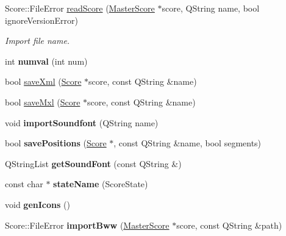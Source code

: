 \begin{DoxyCompactItemize}
Score\+::\+File\+Error \hyperlink{namespace_ms_ad2944b23a7131292b8ff341d5c023904}{read\+Score} (\hyperlink{class_ms_1_1_master_score}{Master\+Score} $\ast$score, Q\+String name, bool ignore\+Version\+Error)
\begin{DoxyCompactList}\small\item\em Import file {\itshape name}. \end{DoxyCompactList}\item 
\mbox{\label{namespace_ms_af4061ca30665502e54ca52ba2db37c64}} 
int {\bfseries numval} (int num)
\item 
bool \hyperlink{namespace_ms_a3a19855d7730ea26f4769d635488df1d}{save\+Xml} (\hyperlink{class_ms_1_1_score}{Score} $\ast$score, const Q\+String \&name)
\item 
bool \hyperlink{namespace_ms_a772f048bd958bf708fd495e49c49aac8}{save\+Mxl} (\hyperlink{class_ms_1_1_score}{Score} $\ast$score, const Q\+String \&name)
\item 
\mbox{\label{namespace_ms_a1962d0f797290cd3ca96f82da266c8ed}} 
void {\bfseries import\+Soundfont} (Q\+String name)
\item 
\mbox{\label{namespace_ms_a0f48b6d19da3ebc8e1fd1072fc31b4c0}} 
bool {\bfseries save\+Positions} (\hyperlink{class_ms_1_1_score}{Score} $\ast$, const Q\+String \&name, bool segments)
\item 
\mbox{\label{namespace_ms_a65304453edffc3e71d00f2590dffe47d}} 
Q\+String\+List {\bfseries get\+Sound\+Font} (const Q\+String \&)
\item 
\mbox{\label{namespace_ms_ad1ad21ee88aedd25d4bf1766c69895d4}} 
const char $\ast$ {\bfseries state\+Name} (Score\+State)
\item 
\mbox{\label{namespace_ms_a9c9c190b9201664e8a98aab7bbcd48a6}} 
void {\bfseries gen\+Icons} ()
\item 
\mbox{\label{namespace_ms_a8a72efe41a427d32c0107483bc8e3e6e}} 
Score\+::\+File\+Error {\bfseries import\+Bww} (\hyperlink{class_ms_1_1_master_score}{Master\+Score} $\ast$score, const Q\+String \&path)
\item 
\mbox{\label{namespace_ms_acfef3d0decb45e3dfba71d33debac7a4}} 

\end{DoxyCompactItemize}
